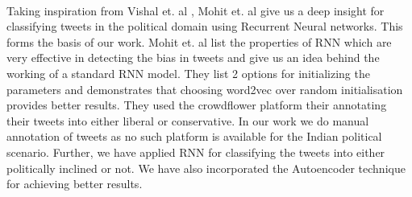 \documentclass[a4paper,11pt]{article}
\begin{document}
\medskip\\
Taking inspiration from Vishal et. al \cite{kharde2016sentiment}, Mohit et. al \cite{iyyer2014political}  give us a deep insight for classifying tweets in the political domain using Recurrent Neural networks. This forms the basis of our work. Mohit et. al \cite{iyyer2014political} list the properties of RNN which are very effective in detecting the bias in tweets and give us an idea behind the working of a standard RNN model. They list 2 options for initializing the parameters and demonstrates that choosing word2vec over random initialisation provides better results. They used the crowdflower platform their annotating their tweets into either liberal or conservative. In our work we do manual annotation of tweets as no such platform is available for the Indian political scenario. Further, we have applied RNN for classifying the tweets into either politically inclined or not. We have also  incorporated the Autoencoder technique for achieving better results. 
\medskip\\
\end{document}
